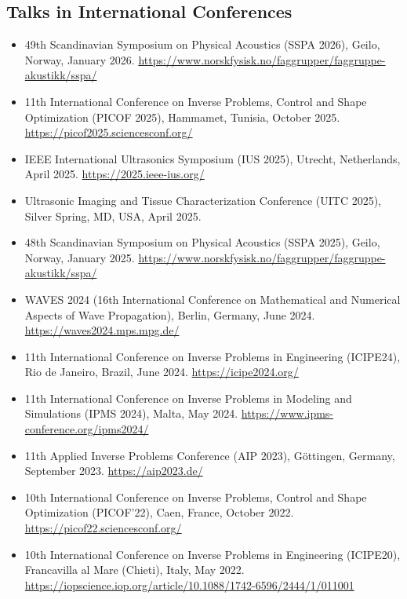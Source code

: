 \documentclass[10pt]{article} %
\begin{document}
\subsection{Talks in International Conferences}
\begin{itemize}
\item 49th Scandinavian Symposium on Physical Acoustics (SSPA 2026), Geilo, Norway, January 2026. \url{https://www.norskfysisk.no/faggrupper/faggruppe-akustikk/sspa/}
\item 11th International Conference on Inverse Problems, Control and Shape Optimization (PICOF 2025), Hammamet, Tunisia, October 2025. \url{https://picof2025.sciencesconf.org/}
\item IEEE International Ultrasonics Symposium (IUS 2025), Utrecht, Netherlands, April 2025. \url{https://2025.ieee-ius.org/}
\item Ultrasonic Imaging and Tissue Characterization Conference (UITC 2025), Silver Spring, MD, USA, April 2025.
\item 48th Scandinavian Symposium on Physical Acoustics (SSPA 2025), Geilo, Norway, January 2025. \url{https://www.norskfysisk.no/faggrupper/faggruppe-akustikk/sspa/}
\item WAVES 2024 (16th International Conference on Mathematical and Numerical Aspects of Wave Propagation), Berlin, Germany, June 2024. \url{https://waves2024.mps.mpg.de/}
\item 11th International Conference on Inverse Problems in Engineering (ICIPE24), Rio de Janeiro, Brazil, June 2024. \url{https://icipe2024.org/}
\item 11th International Conference on Inverse Problems in Modeling and Simulations (IPMS 2024), Malta, May 2024. \url{https://www.ipms-conference.org/ipms2024/}
\item 11th Applied Inverse Problems Conference (AIP 2023), Göttingen, Germany, September 2023. \url{https://aip2023.de/}
\item 10th International Conference on Inverse Problems, Control and Shape Optimization (PICOF'22), Caen, France, October 2022. \url{https://picof22.sciencesconf.org/}
\item 10th International Conference on Inverse Problems in Engineering (ICIPE20), Francavilla al Mare (Chieti), Italy, May 2022. \url{https://iopscience.iop.org/article/10.1088/1742-6596/2444/1/011001}
\end{itemize}
\end{document}
